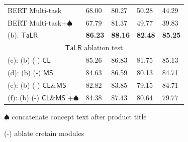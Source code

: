 \begin{table}[!th]
\begin{threeparttable}[b]
\begin{tabular}{l|llll}
    BERT Multi-task & 68.00 & 80.27 & 50.28 & 44.29 \\
    BERT Multi-task+$\spadesuit$ & 67.79 & 81.37 & 49.77 & 39.83 \\
    (b): $\mathsf{TaLR}$ & \textbf{86.23} & \textbf{88.16} & \textbf{82.48} & \textbf{85.25}\\
    \midrule
    \multicolumn{5}{c}{$\mathsf{TaLR}$ ablation test}\\
    \midrule
    (c): (b) (-) $\mathsf{CL}$ & 85.26  & 86.83  & 81.75  & 85.13 \\
    (d): (b) (-) $\mathsf{MS}$ & {84.63}  & {86.59}  & {80.13}  & {84.71}  \\
    (e): (b) (-) $\mathsf{CL}$\&$\mathsf{MS}$ & 82.82 & 83.85 & 79.15 & 84.71 \\
    (f): (b) (-) $\mathsf{CL}$\&$\mathsf{MS}$ +$\spadesuit$ & 84.38 & 87.43 & 80.64 & 79.77 \\


    \bottomrule
  \end{tabular}
  \begin{tablenotes}
    \item[$\spadesuit$] concatenate concept text after product title
    \item[(-)] ablate cretain modules
  \end{tablenotes}
  \end{threeparttable}
\end{table}
